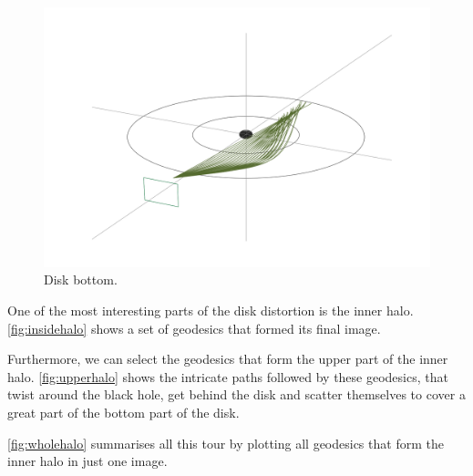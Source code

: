 \begin{figure}[bth]
	\myfloatalign
	\includegraphics[width=\linewidth]{gfx/under_disk}
	\caption[Disk bottom.]{Disk bottom.}
	\label{fig:under_disk}
\end{figure}

One of the most interesting parts of the disk distortion is the inner halo. \autoref{fig:insidehalo} shows a set of geodesics that formed its final image.

Furthermore, we can select the geodesics that form the upper part of the inner halo. \autoref{fig:upperhalo} shows the intricate paths followed by these geodesics, that twist around the black hole, get behind the disk and scatter themselves to cover a great part of the bottom part of the disk.

\autoref{fig:wholehalo} summarises all this tour by plotting all geodesics that form the inner halo in just one image.

